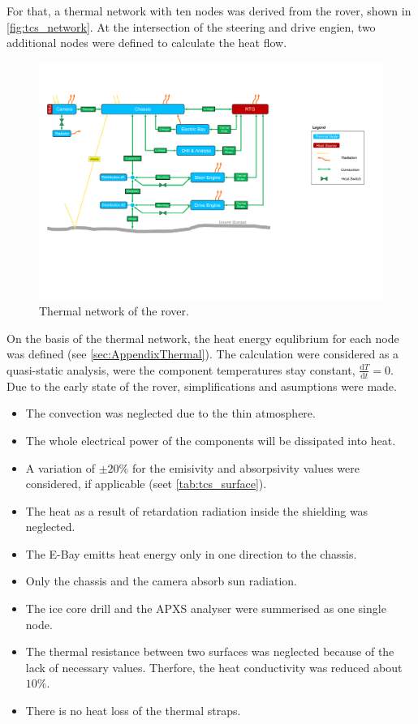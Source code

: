 For that, a thermal network with ten nodes was derived from the rover, shown in \autoref{fig:tcs_network}.
At the intersection of the steering and drive engien, two additional nodes were defined to calculate the heat flow.


\begin{figure}[H]
	\centering
	\includegraphics[width=1\textwidth]{Media/tcs_network}
	\caption{Thermal network of the rover.}
	\label{fig:tcs_network}
\end{figure}

On the basis of the thermal network, the heat energy equlibrium for each node was defined (see \autoref{sec:AppendixThermal}).
The calculation were considered as a quasi-static analysis, were the component temperatures stay constant, $\frac{\text{d}T}{\text{d}t}=0$.
Due to the early state of the rover, simplifications and asumptions were made.
\begin{itemize}
	\item The convection was neglected due to the thin atmosphere.
	\item The whole electrical power of the components will be dissipated into heat.
	\item A variation of $\pm 20\%$ for the emisivity and absorpsivity values were considered, if applicable (seet \autoref{tab:tcs_surface}).
	\item The heat as a result of retardation radiation inside the shielding was neglected.
	\item The E-Bay emitts heat energy only in one direction to the chassis.
	\item Only the chassis and the camera absorb sun radiation.
	\item The ice core drill and the APXS analyser were summerised as one single node.
	\item The thermal resistance between two surfaces was neglected because of the lack of necessary values. Therfore, the heat conductivity was reduced about $10\%$.
	\item There is no heat loss of the thermal straps.
\end{itemize}





